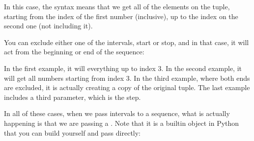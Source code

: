 \documentclass[a4paper,10pt,english]{sphinxmanual}
\begin{document}
In this case, the syntax means that we get all of the elements on the tuple, starting from the index of the first number
(inclusive), up to the index on the second one (not including it).

You can exclude either one of the intervals, start or stop, and in that case, it will act from the beginning or end of
the sequence:

\begin{sphinxVerbatim}[commandchars=\\\{\}]
 \PYG{p}{[}\PYG{p}{]}
\PYG{p}{[}\PYG{p}{]}
\PYG{p}{[}\PYG{p}{]}
\PYG{p}{[}\PYG{p}{]}
\end{sphinxVerbatim}

In the first example, it will everything up to index 3. In the second example, it will get all numbers starting from
index 3. In the third example, where both ends are excluded, it is actually creating a copy of the original tuple. The
last example includes a third parameter, which is the step.

In all of these cases, when we pass intervals to a sequence, what is actually happening is that we are passing a
. Note that it is a built\sphinxhyphen{}in object in Python that you can build yourself and pass directly:

\begin{sphinxVerbatim}[commandchars=\\\{\}]
  
 \PYG{p}{[}\PYG{p}{]}
   
 \PYG{p}{[}\PYG{p}{]}  \PYG{p}{[}\PYG{p}{]}
\end{sphinxVerbatim}
\end{document}
